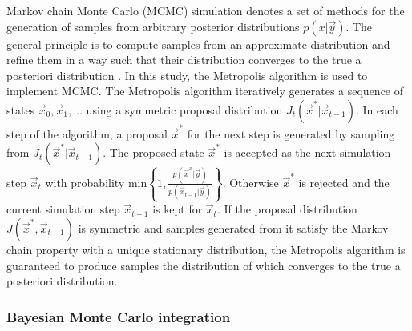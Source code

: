 \documentclass[journal abbreviation, manuscript]{copernicus}
\begin{document}
Markov chain Monte Carlo (MCMC) simulation denotes a set of methods for the
generation of samples from arbitrary posterior distributions $p(x | \vec{y})$.
The general principle is to compute samples from an approximate distribution and
refine them in a way such that their distribution converges to the true a
posteriori distribution \citep{bda}. In this study, the Metropolis algorithm is
used to implement MCMC. The Metropolis algorithm iteratively generates a
sequence of states $\vec{x}_0, \vec{x}_1, \ldots$ using a symmetric proposal
distribution $J_t(\vec{x}^* | \vec{x}_{t-1})$. In each step of the algorithm, a
proposal $\vec{x}^*$ for the next step is generated by sampling from
$J_t(\vec{x}^* | \vec{x}_{t-1})$. The proposed state $\vec{x}^*$ is accepted as
the next simulation step $\vec{x}_t$ with probability $\text{min} \left \{1,
\frac{p(\vec{x}^x | \vec{y})}{p(\vec{x}_{t-1} | \vec{y})} \right \}$. Otherwise
$\vec{x}^*$ is rejected and the current simulation step $\vec{x}_{t-1}$ is kept
for $\vec{x}_t$. If the proposal distribution $J(\vec{x}^*, \vec{x}_{t-1})$ is
symmetric and samples generated from it satisfy the Markov chain property with a
unique stationary distribution, the Metropolis algorithm is guaranteed to
produce samples the distribution of which converges to the true a posteriori
distribution.

\subsubsection{Bayesian Monte Carlo integration}
\end{document}
